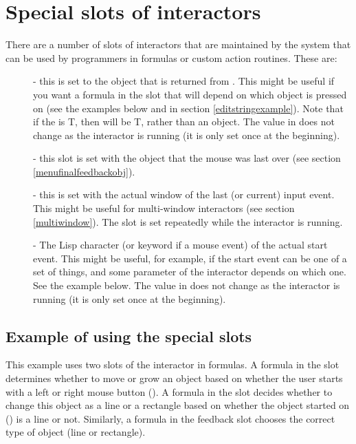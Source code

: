 \section{Special slots of interactors}
\label{specialslots}

There are a number of slots of
interactors that are maintained by the system that can be used by
programmers in formulas or custom action routines.  These are:
\begin{description}
\item[]  - this is set to the object that is returned from
.  This might be useful if you want a formula in the
 slot that will depend on which object is pressed on
(see the examples below and in section \ref{editstringexample}).  Note that
if the  is T, then
 will be T, rather than an object.  The value in
 does not change as the interactor is running (it is
only set once at the beginning).

\item[]  - this slot is set with the object that the mouse
was last over (see section \ref{menufinalfeedbackobj}).

\item[]  - this is set with the actual window of the last (or
current) input event. This might be useful for multi-window interactors (see
section \ref{multiwindow}).  The  slot is set
repeatedly while the interactor is running.

\item[]  - The Lisp character (or keyword if a mouse event) of the
actual start event.  This
might be useful, for example, if the start event can be one of a set of
things, and some parameter of the interactor depends on which one.  See the
example below.  The value in
 does not change as the interactor is running (it is
only set once at the beginning).

\end{description}

\subsection{Example of using the special slots}

This example uses two slots of the interactor in formulas.  A formula in the
 slot determines whether to move or grow an object based on
whether the user starts with a left or right mouse button
().  A formula in
the  slot decides whether to change this object as a line or a
rectangle based on
whether the object started on () is a line or not.
Similarly, a formula in the feedback slot chooses the correct type of
object (line or rectangle).

